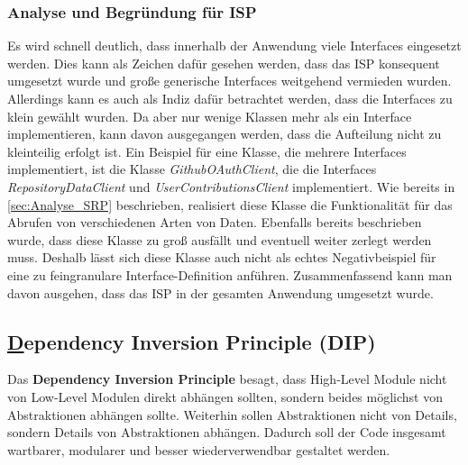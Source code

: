 \subsubsection{Analyse und Begründung für ISP}
Es wird schnell deutlich, dass innerhalb der Anwendung viele Interfaces eingesetzt werden.
Dies kann als Zeichen dafür gesehen werden, dass das ISP konsequent umgesetzt wurde und große generische Interfaces weitgehend vermieden wurden.
Allerdings kann es auch als Indiz dafür betrachtet werden, dass die Interfaces zu klein gewählt wurden.
Da aber nur wenige Klassen mehr als ein Interface implementieren, kann davon ausgegangen werden, dass die Aufteilung nicht zu kleinteilig erfolgt ist.
Ein Beispiel für eine Klasse, die mehrere Interfaces implementiert, ist die Klasse \textit{GithubOAuthClient}, die die Interfaces \textit{RepositoryDataClient} und \textit{UserContributionsClient} implementiert. 
Wie bereits in \ref{sec:Analyse_SRP} beschrieben, realisiert diese Klasse die Funktionalität für das Abrufen von verschiedenen Arten von Daten.
Ebenfalls bereits beschrieben wurde, dass diese Klasse zu groß ausfällt und eventuell weiter zerlegt werden muss.
Deshalb lässt sich diese Klasse auch nicht als echtes Negativbeispiel für eine zu feingranulare Interface-Definition anführen.
\newline
Zusammenfassend kann man davon ausgehen, dass das ISP in der gesamten Anwendung umgesetzt wurde.


\newpage
\subsection{\underline{D}ependency Inversion Principle (DIP)}
\label{sec:DIP}

Das \textbf{Dependency Inversion Principle} besagt, dass High-Level Module nicht von Low-Level Modulen direkt abhängen sollten, sondern beides möglichst von Abstraktionen abhängen sollte.
Weiterhin sollen Abstraktionen nicht von Details, sondern Details von Abstraktionen abhängen.
Dadurch soll der Code insgesamt wartbarer, modularer und besser wiederverwendbar gestaltet werden.

